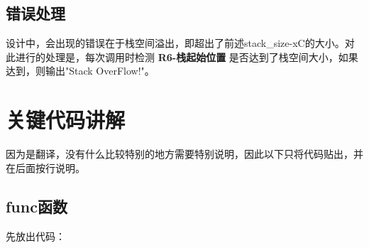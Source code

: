\documentclass[UTF8]{article}
\begin{document}
\subsection{错误处理}
设计中，会出现的错误在于栈空间溢出，即超出了前述stack\_size-xC的大小。对此进行的处理是，每次调用时检测 \textbf{R6-栈起始位置} 是否达到了栈空间大小，如果达到，则输出"Stack OverFlow!"。\par



\section{关键代码讲解}
因为是翻译，没有什么比较特别的地方需要特别说明，因此以下只将代码贴出，并在后面按行说明。\par
\subsection{func函数}
先放出代码：\par
\end{document}

